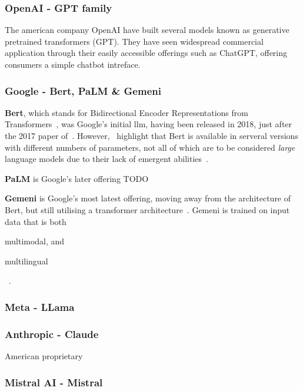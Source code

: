 \subsubsection*{OpenAI - GPT family}

The american company OpenAI have built several models known as generative pretrained transformers
(GPT). They have seen widespread  commercial application through their easily accessible offerings
such as ChatGPT, offering consumers a simple chatbot intreface.

\subsubsection*{Google - Bert, PaLM \& Gemeni}

\textbf{Bert}, which stands for Bidirectional Encoder Representations from
Transformers~\cite{bertPaper}, was Google's initial \acrshort{llm}, having been released in 2018,
just after the 2017 paper of~\citeauthor{attentionIsAllYouNeed}. However,~\citeauthor{llmSurvey}
highlight that Bert is available in serveral versions with different numbers of parameters, not all
of which are to be considered \textit{large} language models due to their lack of emergent
abilities~\cite[1, 3, 86]{llmSurvey}.

\textbf{PaLM} is Google's later offering TODO

\textbf{Gemeni} is Google's most latest offering, moving away from the architecture of Bert, but
still utilising a transformer architecture~\cite[3]{gemeniReport}. Gemeni is trained on input data
that is both \begin{inparaenum}
    \item multimodal, and
    \item multilingual
\end{inparaenum}~\cite[5]{gemeniReport}.

\subsubsection*{Meta - LLama}


\subsubsection*{Anthropic - Claude}

American proprietary

\subsubsection*{Mistral AI - Mistral}

